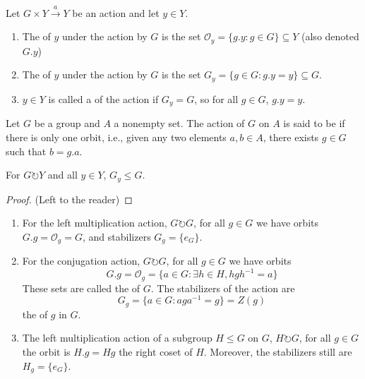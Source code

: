\documentclass[12pt, a4paper, oneside, openright, titlepage]{book}
\begin{document}
\begin{defn}
        Let $G\times Y \xrightarrow{a} Y$ be an action and let $y \in Y$. \begin{enumerate}
                \item The  of $y$ under the action by $G$ is the set $\mathcal{O}_y = \{g.y:g\in G\}\subseteq Y$ (also denoted $G.y$)
                \item The  of $y$ under the action by $G$ is the set $G_y = \{g\in G:g.y = y\}\subseteq G$.
                \item $y \in Y$ is called a  of the action if $G_y = G$, so for all $g \in G$, $g.y = y$.
        \end{enumerate}
\end{defn}

\begin{defn}
    Let $G$ be a group and $A$ a nonempty set. The action of $G$ on $A$ is said to be  if there is only one orbit, i.e., given any two elements $a,b \in A$, there exists $g \in G$ such that $b = g.a$.
\end{defn}



\begin{prop}
        For $G \circlearrowright Y$ and all $y \in Y$, $G_y \leq G$.
\end{prop}
\begin{proof}
        (Left to the reader)
\end{proof}


\begin{eg}
        \leavevmode
        \begin{enumerate}
                \item For the left multiplication action, $G \circlearrowright G$, for all $g \in G$ we have orbits $G.g = \mathcal{O}_g = G$, and stabilizers $G_g = \{e_G\}$.
                \item For the conjugation action, $G \circlearrowright G$, for all $g \in G$ we have orbits \begin{equation}
                                G.g = \mathcal{O}_g = \{a \in G:\exists h \in H, hgh^{-1} = a\}
                \end{equation}
                        These sets are called the  of $G$. The stabilizers of the action are \begin{equation}
                                G_g = \{a \in G: aga^{-1} = g\} = Z(g)
                        \end{equation}
                        the  of $g$ in $G$.
                \item The left multiplication action of a subgroup $H \leq G$ on $G$, $H \circlearrowright G$, for all $g \in G$ the orbit is $H.g = Hg$ the right coset of $H$. Moreover, the stabilizers still are $H_g = \{e_G\}$.
        \end{enumerate}
\end{eg}
\end{document}
